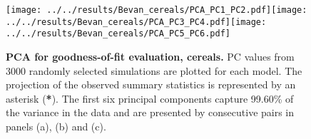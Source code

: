 \documentclass[a4paper]{article}
\begin{document}
\begin{figure}[h]
\begin{center}
\texttt{[image: ../../results/Bevan\_cereals/PCA\_PC1\_PC2.pdf]}\texttt{[image: ../../results/Bevan\_cereals/PCA\_PC3\_PC4.pdf]}\texttt{[image: ../../results/Bevan\_cereals/PCA\_PC5\_PC6.pdf]}
\end{center}
\caption{\textbf{PCA for goodness-of-fit evaluation, cereals.} PC values from 3000 randomly selected simulations are plotted for each model. The projection of the observed summary statistics is represented by an asterisk (\textbf{*}). The first six principal components capture 99.60\% of the variance in the data and are presented by consecutive pairs in panels (a), (b) and (c).}
\label{fig:PCA_cereals}
\end{figure}
\end{document}
